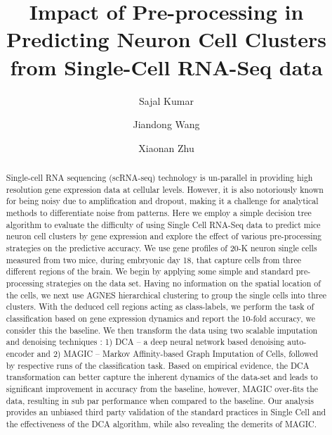 \documentclass[sigconf]{acmart}
\begin{document}
\title{Impact of Pre-processing in Predicting Neuron Cell Clusters from Single-Cell RNA-Seq data}

\author{Sajal Kumar}

\author{Jiandong Wang}

\author{Xiaonan Zhu}
\renewcommand{\shortauthors}{S. Kumar et al.}


\begin{abstract}
Single-cell RNA sequencing (scRNA-seq) technology is un-parallel in providing high resolution gene expression data at cellular levels. However, it is also notoriously known for being noisy due to amplification and dropout, making it a challenge for analytical methods to differentiate noise from patterns. Here we employ a simple decision tree algorithm to evaluate the difficulty of using Single Cell RNA-Seq data to predict mice neuron cell clusters by gene expression and explore the effect of various pre-processing strategies on the predictive accuracy. We use gene profiles of 20-K neuron single cells measured from two mice, during embryonic day 18, that capture cells from three different regions of the brain. We begin by applying some simple and standard pre-processing strategies on the data set. Having no information on the spatial location of the cells, we next use AGNES hierarchical clustering to group the single cells into three clusters. With the deduced cell regions acting as class-labels, we perform the task of classification based on gene expression dynamics and report the 10-fold accuracy, we consider this the baseline. We then transform the data using two scalable imputation and denoising techniques : 1) DCA -- a deep neural network based denoising auto-encoder and 2) MAGIC -- Markov Affinity-based Graph Imputation of Cells, followed by respective runs of the classification task. Based on empirical evidence, the DCA transformation can better capture the inherent dynamics of the data-set and leads to significant improvement in accuracy from the baseline, however, MAGIC over-fits the data, resulting in sub par performance when compared to the baseline. Our analysis provides an unbiased third party validation of the standard practices in Single Cell and the effectiveness of the DCA algorithm, while also revealing the demerits of MAGIC.
\end{abstract}
\end{document}
